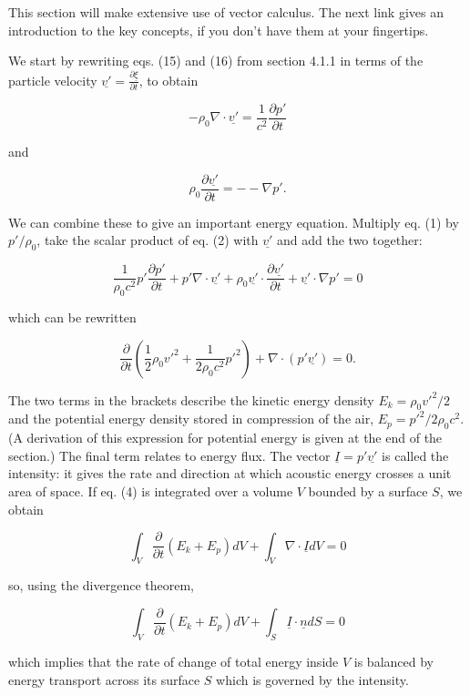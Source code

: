  This section will make extensive use of vector calculus. The next link gives 
  an introduction to the key concepts, if you don't have them at your 
  fingertips. 

  We start by rewriting eqs. (15) and (16) from section 4.1.1 in terms of the 
  particle velocity $\underline{v'}=\frac{\partial \underline{\xi}}{\partial 
  t}$, to obtain 

  $$-\rho_0 \nabla \cdot \underline{v'} = \frac{1}{c^2} \frac{\partial 
  p'}{\partial t} \tag{1}$$ 

  and 

  $$\rho_0 \frac{\partial \underline{v'}}{\partial t} = -- \nabla p' . 
  \tag{2}$$ 

  We can combine these to give an important energy equation. Multiply eq. (1) 
  by $p'/\rho_0$, take the scalar product of eq. (2) with $\underline{v'}$ and 
  add the two together: 

  $$\dfrac{1}{\rho_0 c^2} p' \dfrac{\partial p'}{\partial t} + p' \nabla \cdot 
  \underline{v'} + \rho_0 \underline{v'} \cdot \dfrac{\partial 
  \underline{v'}}{\partial t} + \underline{v'} \cdot \nabla p' = 0 \tag{3}$$ 

  which can be rewritten 

  $$\dfrac{\partial}{\partial t} \left( \dfrac{1}{2} \rho_0 v'^2 + \dfrac{1}{2 
  \rho_0 c^2} p'^2 \right) + \nabla \cdot (p' \underline{v'}) = 0 . \tag{4}$$ 

  The two terms in the brackets describe the kinetic energy density $E_k=\rho_0 
  v'^2/2$ and the potential energy density stored in compression of the air, 
  $E_p=p'^2/2 \rho_0 c^2$. (A derivation of this expression for potential 
  energy is given at the end of the section.) The final term relates to energy 
  flux. The vector $\underline{I}=p' \underline{v'}$ is called the intensity: 
  it gives the rate and direction at which acoustic energy crosses a unit area 
  of space. If eq. (4) is integrated over a volume $V$ bounded by a surface 
  $S$, we obtain 

  $$\int_V{\dfrac{\partial}{\partial t} (E_k+E_p) dV} + \int_V{\nabla \cdot 
  \underline{I} dV}=0 \tag{5}$$ 

  so, using the divergence theorem, 

  $$\int_V{\dfrac{\partial}{\partial t} (E_k+E_p) dV} + \int_S{\underline{I} 
  \cdot \underline{n} dS}=0 \tag{6}$$ 

  which implies that the rate of change of total energy inside $V$ is balanced 
  by energy transport across its surface $S$ which is governed by the 
  intensity. 

